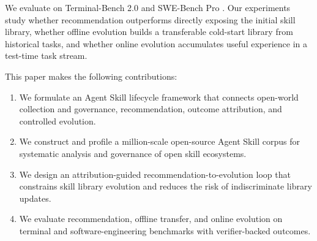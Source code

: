 We evaluate \ours on Terminal-Bench 2.0 and SWE-Bench Pro \citep{merrill2026terminal,deng2025swe}. Our experiments study whether recommendation outperforms directly exposing the initial skill library, whether offline evolution builds a transferable cold-start library from historical tasks, and whether online evolution accumulates useful experience in a test-time task stream.

This paper makes the following contributions:
\begin{enumerate}
    \setlength{\itemsep}{0pt}
    \item We formulate an Agent Skill lifecycle framework that connects open-world collection and governance, recommendation, outcome attribution, and controlled evolution.
    \item We construct and profile a million-scale open-source Agent Skill corpus for systematic analysis and governance of open skill ecosystems.
    \item We design an attribution-guided recommendation-to-evolution loop that constrains skill library evolution and reduces the risk of indiscriminate library updates.
    \item We evaluate recommendation, offline transfer, and online evolution on terminal and software-engineering benchmarks with verifier-backed outcomes.
\end{enumerate}
